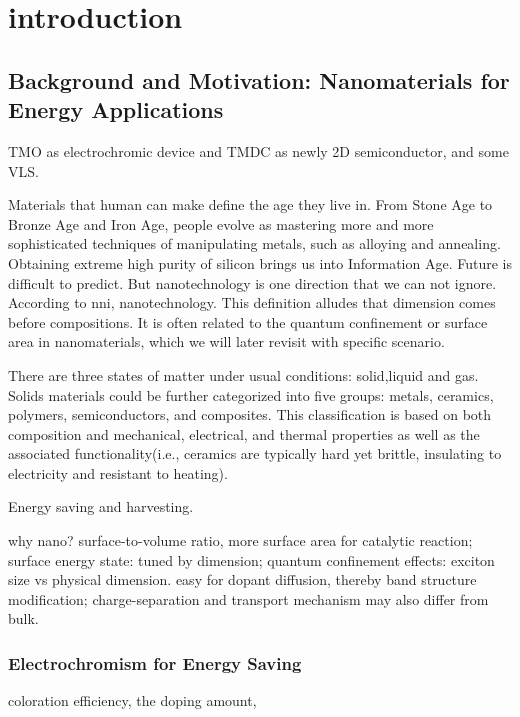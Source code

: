 
\chapter{introduction}

\section{Background and Motivation: Nanomaterials for Energy Applications}

TMO as electrochromic device and TMDC as newly 2D semiconductor, and some VLS.

Materials that human can make define the age they live in. From Stone Age to Bronze Age and Iron Age, people evolve as mastering more and more sophisticated techniques of manipulating metals, such as alloying and annealing. Obtaining extreme high purity of silicon brings us into Information Age. Future is difficult to predict. But nanotechnology is one direction that we can not ignore. According to \gls{nni}, \gls{nanotechnology}. This definition alludes that dimension comes before compositions. It is often related to the quantum confinement or surface area in nanomaterials, which we will later revisit with specific scenario.

There are three states of matter under usual conditions: solid,liquid and gas. Solids materials could be further categorized into five groups: metals, ceramics, polymers, semiconductors, and composites.\cite{William2009} This classification is based on both composition and mechanical, electrical, and thermal properties as well as the associated functionality(i.e., \gls{ceramics} are typically hard yet brittle, insulating to electricity and resistant to heating).

Energy saving and harvesting. 


why nano? surface-to-volume ratio, more surface area for catalytic reaction; surface energy state: tuned by dimension; quantum confinement effects: exciton size vs physical dimension. easy for dopant diffusion, thereby band structure modification; charge-separation and transport mechanism may also differ from bulk.

\subsection{Electrochromism for Energy Saving}

coloration efficiency, the doping amount, 

